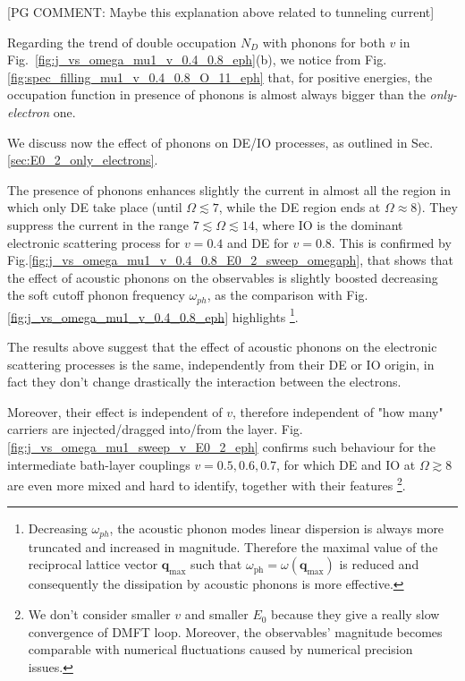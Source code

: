 \documentclass[aps,prb,groupedaddress,showpacs,twocolumn,superscriptaddress,10pt]{revtex4-2}
\renewcommand{\vec}[1]{\bm{#1}} %
\newcommand{\pgcomm}[1]{{\color{ao(english)} [PG COMMENT: #1]}}
\begin{document}
\pgcomm{Maybe this explanation above related to tunneling current} 
 
    
Regarding the trend of double occupation $N_D$ with phonons for both $v$ in Fig.~\ref{fig:j_vs_omega_mu1_v_0.4_0.8_eph}(b), we notice from Fig.\ref{fig:spec_filling_mu1_v_0.4_0.8_O_11_eph} that, for positive energies,  the occupation function in presence of phonons is almost always bigger than the \emph{only-electron} one. 

We discuss now the effect of phonons on DE/IO processes, as outlined in Sec.\ref{sec:E0_2_only_electrons}. 

The presence of phonons enhances slightly the current in almost all the region in which only DE take place (until $\Omega\lesssim7$, while the DE region ends at $\Omega\approx8$). They suppress the current in the range $7\lesssim\Omega\lesssim14$, where IO is the dominant electronic scattering process for $v=0.4$ and DE for $v=0.8$. This is confirmed by Fig.\ref{fig:j_vs_omega_mu1_v_0.4_0.8_E0_2_sweep_omegaph}, that shows that the effect of acoustic phonons on the observables is slightly boosted decreasing the soft cutoff phonon frequency $\omega_{ph}$, as the comparison with Fig.\ref{fig:j_vs_omega_mu1_v_0.4_0.8_eph} highlights \footnote{Decreasing $\omega_{ph}$, the acoustic phonon modes linear dispersion is always more truncated and increased in magnitude. Therefore the maximal value of the reciprocal lattice vector $\vec{q}_{\text{max}}$ such that $\omega_{\text{ph}}=\omega(\vec{q}_{\text{max}})$ \cite{ma.ga.22u} is reduced and consequently the dissipation by acoustic phonons is more effective.}. 
  
The results above suggest that the effect of acoustic phonons on the electronic scattering processes is the same, independently from their DE or IO origin, in fact they don't change drastically the interaction between the electrons. 
 
Moreover, their effect is independent of $v$, therefore independent of "how many" carriers are injected/dragged into/from the layer. Fig.\ref{fig:j_vs_omega_mu1_sweep_v_E0_2_eph} confirms such behaviour for the intermediate bath-layer couplings $v=0.5,0.6,0.7$, for which DE and IO at $\Omega\gtrsim8$ are even more mixed and hard to identify, together with their features \footnote{We don't consider smaller $v$ and smaller $E_0$ because they give a really slow convergence of DMFT loop. Moreover, the observables' magnitude becomes comparable with numerical fluctuations caused by numerical precision issues.}. 
\end{document}
